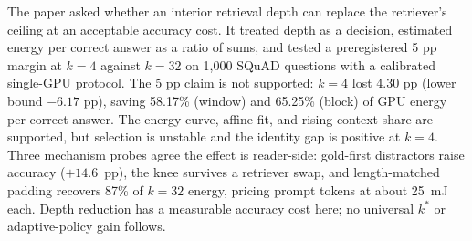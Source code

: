 \documentclass[a4paper,fleqn]{cas-sc}
\begin{document}
The paper asked whether an interior retrieval depth can replace the retriever's ceiling at an acceptable accuracy cost. It treated depth as a decision, estimated energy per correct answer as a ratio of sums, and tested a preregistered 5 pp margin at $k=4$ against $k=32$ on 1{,}000 SQuAD questions with a calibrated single-GPU protocol. The 5 pp claim is not supported: $k=4$ lost 4.30 pp (lower bound $-6.17$ pp), saving 58.17\% (window) and 65.25\% (block) of GPU energy per correct answer. The energy curve, affine fit, and rising context share are supported, but selection is unstable and the identity gap is positive at $k=4$. Three mechanism probes agree the effect is reader-side: gold-first distractors raise accuracy ($+14.6$~pp), the knee survives a retriever swap, and length-matched padding recovers 87\% of $k=32$ energy, pricing prompt tokens at about 25~mJ each. Depth reduction has a measurable accuracy cost here; no universal $k^{*}$ or adaptive-policy gain follows.

\printcredits
\end{document}
